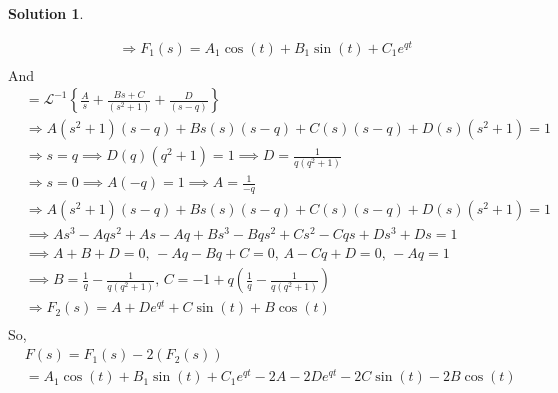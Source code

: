 \documentclass[10pt]{article}
\theoremstyle{definition}
\newtheorem{soln}{Solution}
\newcommand{\laplace}{\mathcal{L}}
\begin{document}
\begin{soln}
\begin{enumerate}[label=(\alph*)]
\begin{align*}
             & \Rightarrow F_1(s)=A_1\cos\left(t\right)+B_1\sin\left(t\right)+C_1e^{qt}                                                                                                                                                                 \\
          \end{align*}
          And
          \begin{align*}
             & =\laplace^{-1}\left\{\frac{A}{s}+\frac{Bs+C}{\left(s^2+1\right)}+\frac{D}{\left(s-q\right)}\right\}                       \\
             & \Rightarrow A\left(s^2+1\right)\left(s-q\right) + Bs(s)\left(s-q\right) + C(s)\left(s-q\right) + D(s)\left(s^2+1\right)=1 \\
             & \Rightarrow s=q \implies D(q)\left(q^2+1\right)=1\implies D=\frac{1}{q\left(q^2+1\right)}                                 \\
             & \Rightarrow s=0 \implies A\left(-q\right)=1\implies A=\frac{1}{-q}                                                        \\
             & \Rightarrow A\left(s^2+1\right)\left(s-q\right) + Bs(s)\left(s-q\right) + C(s)\left(s-q\right) + D(s)\left(s^2+1\right)=1 \\
             & \implies As^3-Aqs^2+As-Aq + Bs^3-Bqs^2 + Cs^2-Cqs + Ds^3+Ds=1                                                             \\
             & \implies A+B+D=0, \, -Aq-Bq+C=0, \, A-Cq+D=0, \, -Aq=1                                                                    \\
             & \implies B=\frac{1}{q}-\frac{1}{q\left(q^2+1\right)}, \, C=-1+q\left(\frac{1}{q}-\frac{1}{q\left(q^2+1\right)}\right)     \\
             & \Rightarrow F_2(s)=A+De^{qt}+C\sin\left(t\right)+B\cos\left(t\right)                                                      \\
          \end{align*}
          So,
          \begin{align*}
             & F(s)=F_1(s)-2(F_2(s))                                                                                                                                                        \\
             & =A_1\cos\left(t\right)+B_1\sin\left(t\right)+C_1e^{qt} -2A-2De^{qt}-2C\sin\left(t\right)-2B\cos\left(t\right)                                                                \\

\end{align*}
\end{enumerate}
\end{soln}
\end{document}
